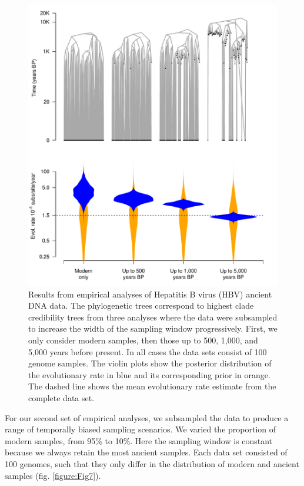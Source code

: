 \documentclass[11pt]{article}
\begin{document}
\begin{figure}[H]
    \begin{center}
        \includegraphics[scale=0.7, angle=0]{empirical_results_depth.pdf}
        \caption{Results from empirical analyses of Hepatitis B virus (HBV) ancient DNA data. The phylogenetic trees correspond to highest clade credibility trees from three analyses where the data were subsampled to increase the width of the sampling window progressively. First, we only consider modern samples, then those up to 500, 1,000, and 5,000 years before present. In all cases the data sets consist of 100 genome samples. The violin plots show the posterior distribution of the evolutionary rate in blue and its corresponding prior in orange. The dashed line shows the mean evolutionary rate estimate from the complete data set.}
        \label{figure:Fig6}
    \end{center}
\end{figure}

For our second set of empirical analyses, we subsampled the data to produce a range of temporally biased sampling scenarios. We varied the proportion of modern samples, from 95\% to 10\%. Here the sampling window is constant because we always retain the most ancient samples. Each data set consisted of 100 genomes, such that they only differ in the distribution of modern and ancient samples (fig. \ref{figure:Fig7}). 
\end{document}
